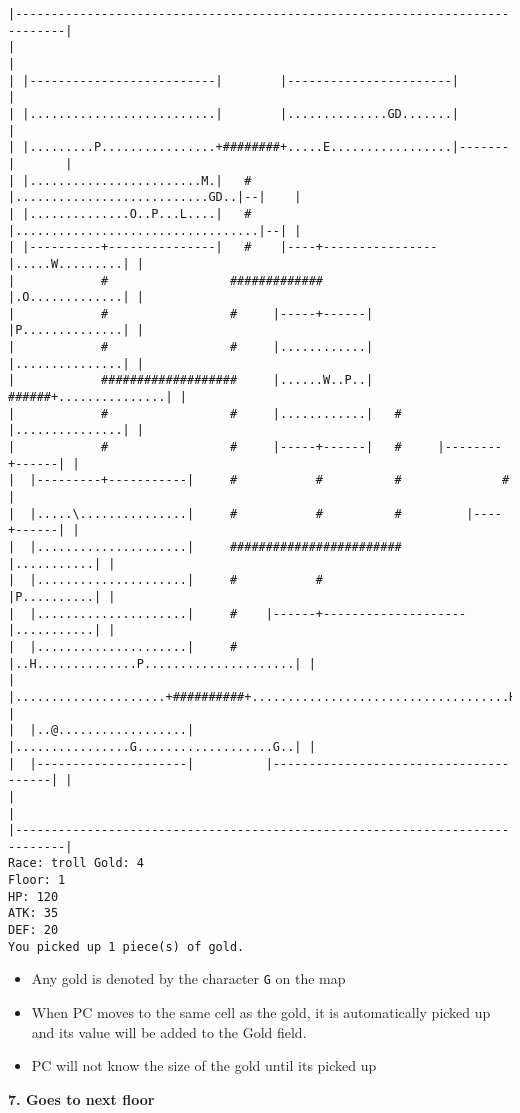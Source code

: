 \documentclass[11pt]{article}
\theoremstyle{plain}
\begin{document}
\begin{Verbatim}[fontsize=\small]
|-----------------------------------------------------------------------------|
|                                                                             |
| |--------------------------|        |-----------------------|               |
| |..........................|        |..............GD.......|               |
| |.........P................+########+.....E.................|-------|       |
| |........................M.|   #    |...........................GD..|--|    |
| |..............O..P...L....|   #    |..................................|--| |
| |----------+---------------|   #    |----+----------------|.....W.........| |
|            #                 #############                |.O.............| |
|            #                 #     |-----+------|         |P..............| |
|            #                 #     |............|         |...............| |
|            ###################     |......W..P..|   ######+...............| |
|            #                 #     |............|   #     |...............| |
|            #                 #     |-----+------|   #     |--------+------| |
|  |---------+-----------|     #           #          #              #        |
|  |.....\...............|     #           #          #         |----+------| |
|  |.....................|     ########################         |...........| |
|  |.....................|     #           #                    |P..........| |
|  |.....................|     #    |------+--------------------|...........| |
|  |.....................|     #    |..H..............P.....................| |
|  |.....................+##########+....................................H..| |
|  |..@..................|          |................G...................G..| |
|  |---------------------|          |---------------------------------------| |
|                                                                             |
|-----------------------------------------------------------------------------|
Race: troll Gold: 4                                                    Floor: 1
HP: 120
ATK: 35
DEF: 20
You picked up 1 piece(s) of gold. 
\end{Verbatim}

\begin{itemize}
    \item Any gold is denoted by the character \texttt{G} on the map
    \item When PC moves to the same cell as the gold, it is automatically picked up
          and its value will be added to the Gold field.
    \item PC will not know the size of the gold until its picked up
\end{itemize}
\textbf{7. Goes to next floor}
\end{document}
